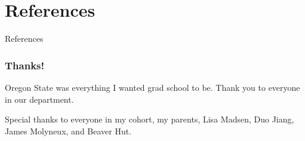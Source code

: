 \documentclass{beamer}
\begin{document}

\section{References}
\begin{frame}{References}
\printbibliography
\end{frame}

\begin{frame}
	\frametitle{Thanks!}
	Oregon State was everything I wanted grad school to be. Thank you to everyone in our department.
	\vspace{.5cm}

	Special thanks to everyone in my cohort, my parents, Lisa Madsen, Duo Jiang, James Molyneux, and Beaver Hut.
\end{frame}
\end{document}
